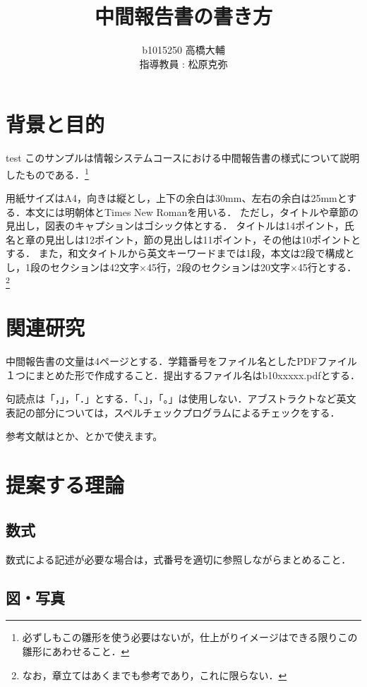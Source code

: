 \documentclass[11pt,a4paper,draft]{jarticle}
\title{中間報告書の書き方}
\author{b1015250 高橋大輔\\指導教員 : 松原克弥}
\begin{document}
\maketitle

\section{背景と目的}

test
このサンプルは情報システムコースにおける中間報告書の様式について説明したものである．\footnote{必ずしもこの雛形を使う必要はないが，仕上がりイメージはできる限りこの雛形にあわせること．}

用紙サイズはA4，向きは縦とし，上下の余白は30mm、左右の余白は25mmとする．本文には明朝体とTimes New Romanを用いる．
ただし，タイトルや章節の見出し，図表のキャプションはゴシック体とする．
タイトルは14ポイント，氏名と章の見出しは12ポイント，節の見出しは11ポイント，その他は10ポイントとする．
また，和文タイトルから英文キーワードまでは1段，本文は2段で構成とし，1段のセクションは42文字×45行，2段のセクションは20文字×45行とする．
\footnote{なお，章立てはあくまでも参考であり，これに限らない．}

\section{関連研究}

中間報告書の文量は4ページとする．学籍番号をファイル名としたPDFファイル１つにまとめた形で作成すること．提出するファイル名はb10xxxxx.pdfとする．

句読点は「，」，「．」とする．「、」，「。」は使用しない．アブストラクトなど英文表記の部分については，スペルチェックプログラムによるチェックをする．

参考文献は\cite{netflix-2016}とか、\cite{lewis-2014}とかで使えます。

\section{提案する理論}

\subsection{数式}

数式による記述が必要な場合は，式番号を適切に参照しながらまとめること．

\subsection{図・写真}
\end{document}
